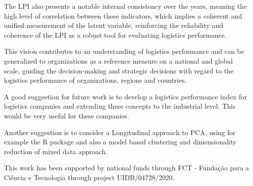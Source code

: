 \documentclass[conference]{IEEEtran}
\begin{document}
The LPI also presents a notable internal consistency over the years, meaning the high level of correlation between these indicators, which  implies a coherent and unified measurement of the latent variable, reinforcing the reliability and coherence of the LPI as a robust tool for evaluating logistics performance.

This vision contributes to an understanding of logistics performance and can be generalized to organizations as a reference measure on a national and global scale, guiding the decision-making and strategic decisions with regard to the logistics performance of organizations, regions and countries.

A good suggestion for future work is to develop a logistics performance index for logistics companies and extending these concepts to the industrial level. This would be very useful for these companies. 

Another suggestion is to consider a Longitudinal approach to PCA, using for example the R package \cite{jarmund2022alasca} and also a model based clustering and dimensionality reduction of mixed data \cite{ranalli2017model} approach.




\begin{acks}
This work has been supported by national funds through FCT - Fundação para a Ciência e Tecnologia through project UIDB/04728/2020.
\end{acks}

\begin{thebibliography}{00}

\end{thebibliography}









\end{document}
